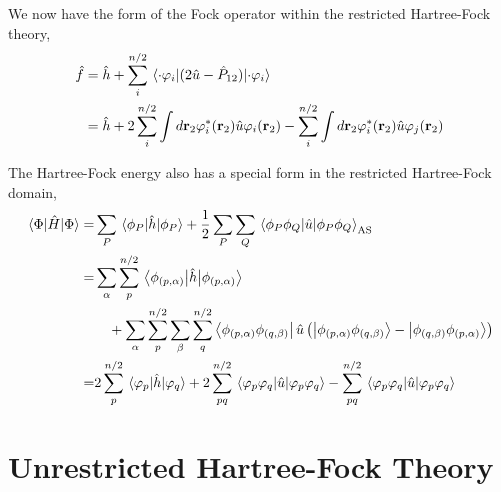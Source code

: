 We now have the form of the Fock operator within the restricted Hartree-Fock theory,
\begin{equation}
    \label{eq:RHF_fock_operator}
    \begin{aligned}
    \hat{f} &= \hat{h} + \sum_i^{n/2} \mel{\cdot\varphi_i}{(2\hat{u} - \hat{P}_{12})}{\cdot\varphi_i} \\
        &= \hat{h} + 2\sum_i^{n/2} \int d\vb{r}_2 \varphi_i^*(\vb{r}_2) \hat{u} \varphi_i(\vb{r}_2)
        -\sum_i^{n/2} \int d\vb{r}_2 \varphi_i^*(\vb{r}_2) \hat{u} \varphi_j(\vb{r}_2)
    \end{aligned}
\end{equation}

The Hartree-Fock energy also has a special form in the restricted Hartree-Fock domain,
\begin{equation}
    \begin{aligned}
        \mel{\Phi}{\hat{H}}{\Phi}
        =& \sum_P \mel{\phi_P}{\hat{h}}{\phi_P}
        + \frac{1}{2}\sum_P \sum_Q \mel{\phi_P \phi_Q}{\hat{u}}{\phi_P \phi_Q}_\text{AS} \\
        =& \sum_\alpha \sum_p^{n/2} \mel{\phi_{(p,\alpha)}}{\hat{h}}{\phi_{(p,\alpha)}} \\
            &\quad + \sum_\alpha \sum_p^{n/2}\sum_\beta \sum_q^{n/2} 
        \bra{\phi_{(p,\alpha)}\phi_{(q,\beta)}}\hat{u}
        \left( 
            \ket{\phi_{(p,\alpha)}\phi_{(q,\beta)}} - \ket{\phi_{(q,\beta)}\phi_{(p,\alpha)}} 
        \right) \\
        =& 2\sum_p^{n/2} \mel{\varphi_p}{\hat{h}}{\varphi_q}
        + 2 \sum_{pq}^{n/2} \mel{\varphi_p\varphi_q}{\hat{u}}{\varphi_p\varphi_q}
        - \sum_{pq}^{n/2} \mel{\varphi_p\varphi_q}{\hat{u}}{\varphi_p\varphi_q}
    \end{aligned}
\end{equation}

\section{Unrestricted Hartree-Fock Theory}

